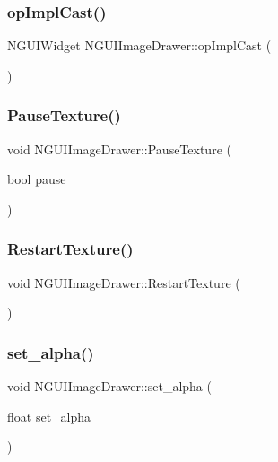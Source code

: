 \subsubsection{\texorpdfstring{op\+Impl\+Cast()}{opImplCast()}}
{\footnotesize\ttfamily N\+G\+U\+I\+Widget N\+G\+U\+I\+Image\+Drawer\+::op\+Impl\+Cast (\begin{DoxyParamCaption}{ }\end{DoxyParamCaption})}

\hypertarget{class_n_g_u_i_image_drawer_a2fe43b02f514f0ec81d2fc06f38c2fda}{}\label{class_n_g_u_i_image_drawer_a2fe43b02f514f0ec81d2fc06f38c2fda} 
\subsubsection{\texorpdfstring{Pause\+Texture()}{PauseTexture()}}
{\footnotesize\ttfamily void N\+G\+U\+I\+Image\+Drawer\+::\+Pause\+Texture (\begin{DoxyParamCaption}\item[{bool}]{pause }\end{DoxyParamCaption})}

\hypertarget{class_n_g_u_i_image_drawer_af2d820dd1f9aeb60f52f95369561dfde}{}\label{class_n_g_u_i_image_drawer_af2d820dd1f9aeb60f52f95369561dfde} 
\subsubsection{\texorpdfstring{Restart\+Texture()}{RestartTexture()}}
{\footnotesize\ttfamily void N\+G\+U\+I\+Image\+Drawer\+::\+Restart\+Texture (\begin{DoxyParamCaption}{ }\end{DoxyParamCaption})}

\hypertarget{class_n_g_u_i_image_drawer_acc4647abd5bfe1bbefec8434dfc9c506}{}\label{class_n_g_u_i_image_drawer_acc4647abd5bfe1bbefec8434dfc9c506} 
\subsubsection{\texorpdfstring{set\+\_\+alpha()}{set\_alpha()}}
{\footnotesize\ttfamily void N\+G\+U\+I\+Image\+Drawer\+::set\+\_\+alpha (\begin{DoxyParamCaption}\item[{float}]{set\+\_\+alpha }\end{DoxyParamCaption})}

